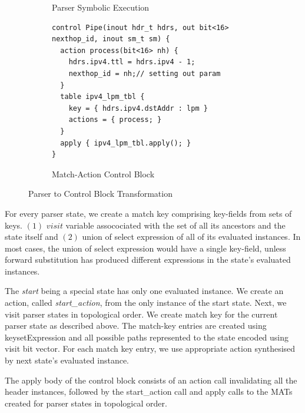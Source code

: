 \begin{figure}[!h]
\begin{subfigure}[b]{0.3\linewidth}
        \caption{Parser Symbolic Execution}
        \label{subfig:parser-symbolic-execution}
    \end{subfigure}
    \begin{subfigure}[b]{.4\linewidth}
\begin{lstlisting}[frame=none]
control Pipe(inout hdr_t hdrs, out bit<16> nexthop_id, inout sm_t sm) {
  action process(bit<16> nh) {
    hdrs.ipv4.ttl = hdrs.ipv4 - 1;
    nexthop_id = nh;// setting out param
  }
  table ipv4_lpm_tbl {
    key = { hdrs.ipv4.dstAddr : lpm } 
    actions = { process; }
  }
  apply { ipv4_lpm_tbl.apply(); }
}
\end{lstlisting}
\caption{Match-Action Control Block}
\label{subfig:parser-symbolic-execution}
\end{subfigure}
\caption{Parser to Control Block Transformation}
\label{fig:parser-to-control-block-transformation}
\end{figure}

For every parser state, we create a match key comprising key-fields from sets of keys. 
$(1)$ $visit$ variable assocociated with the set of all its ancestors and the state itself and
$(2)$ union of select expression of all of its evaluated instances.
In most cases, the union of select expression would have a single key-field, unless forward substitution has produced different expressions in the state's evaluated instances.

The \emph{start} being a special state has only one evaluated instance.
We create an action, called \emph{start\_action}, from the only instance of the start state.
Next, we visit parser states in topological order. 
We create match key for the current parser state as described above.
The match-key entries are created using keysetExpression and all possible paths represented to the state encoded using visit bit vector.
For each match key entry, we use appropriate action synthesised by next state's evaluated instance.

The apply body of the control block consists of an action call invalidating all the header instances, followed by the start\_action call and apply calls to the MATs created for parser states in topological order.



